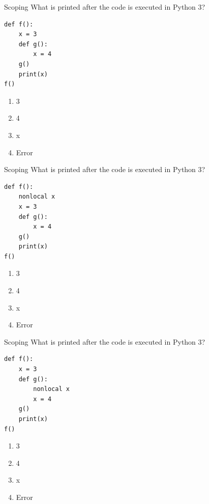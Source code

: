 \documentclass[9pt]{beamer}
\begin{document}
\begin{frame}[fragile]{Scoping}
  What is printed after the code is executed in Python 3?

  \begin{lstlisting}
def f():
    x = 3
    def g():
        x = 4
    g()
    print(x)
f()
  \end{lstlisting}

  \begin{enumerate}
    \item
      \alert<2>{3}
    \item
      4
    \item
      x
    \item
      Error
  \end{enumerate}
\end{frame}

\begin{frame}[fragile]{Scoping}
  What is printed after the code is executed in Python 3?

  \begin{lstlisting}
def f():
    nonlocal x
    x = 3
    def g():
        x = 4
    g()
    print(x)
f()
  \end{lstlisting}

  \begin{enumerate}
    \item
      3
    \item
      4
    \item
      x
    \item
      \alert<2>{Error}
  \end{enumerate}
\end{frame}

\begin{frame}[fragile]{Scoping}
  What is printed after the code is executed in Python 3?

  \begin{lstlisting}
def f():
    x = 3
    def g():
        nonlocal x
        x = 4
    g()
    print(x)
f()
  \end{lstlisting}

  \begin{enumerate}
    \item
      3
    \item
      \alert<2>{4}
    \item
      x
    \item
      Error
  \end{enumerate}
\end{frame}
\end{document}
